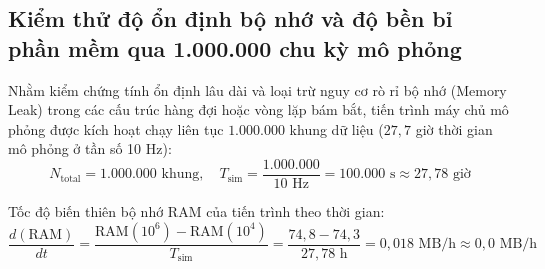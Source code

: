 \begin{table}[H]
\centering
\caption{Đặc tả yêu cầu kỹ thuật và chỉ tiêu tương thích của các linh kiện cảm biến trong kiến trúc trạm đo mục tiêu}
\label{tab:hardware-sensor-spec-requirements}
\end{table}

\subsection{Kiểm thử độ ổn định bộ nhớ và độ bền bỉ phần mềm qua 1.000.000 chu kỳ mô phỏng}

\hspace{0.5cm} Nhằm kiểm chứng tính ổn định lâu dài và loại trừ nguy cơ rò rỉ bộ nhớ (Memory Leak) trong các cấu trúc hàng đợi hoặc vòng lặp bám bắt, tiến trình máy chủ mô phỏng được kích hoạt chạy liên tục $1.000.000$ khung dữ liệu ($27{,}7$ giờ thời gian mô phỏng ở tần số 10 Hz):
\begin{equation}
N_{\text{total}} = 1.000.000\text{ khung}, \quad T_{\text{sim}} = \frac{1.000.000}{10\text{ Hz}} = 100.000\text{ s} \approx 27{,}78\text{ giờ}
\label{eq:stress-test-total-frames}
\end{equation}

Tốc độ biến thiên bộ nhớ RAM của tiến trình theo thời gian:
\begin{equation}
\frac{d(\text{RAM})}{dt} = \frac{\text{RAM}(10^6) - \text{RAM}(10^4)}{T_{\text{sim}}} = \frac{74{,}8 - 74{,}3}{27{,}78\text{ h}} = 0{,}018\text{ MB/h} \approx 0{,}0\text{ MB/h}
\label{eq:memory-leak-rate-slope}
\end{equation}

